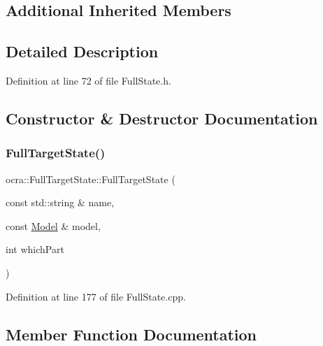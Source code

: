 \subsection*{Additional Inherited Members}


\subsection{Detailed Description}


Definition at line 72 of file Full\+State.\+h.



\subsection{Constructor \& Destructor Documentation}
\hypertarget{classocra_1_1FullTargetState_a8164de6021f986fb82022b2fed1e0402}{}\label{classocra_1_1FullTargetState_a8164de6021f986fb82022b2fed1e0402} 
\subsubsection{\texorpdfstring{Full\+Target\+State()}{FullTargetState()}}
{\footnotesize\ttfamily ocra\+::\+Full\+Target\+State\+::\+Full\+Target\+State (\begin{DoxyParamCaption}\item[{const std\+::string \&}]{name,  }\item[{const \hyperlink{classocra_1_1Model}{Model} \&}]{model,  }\item[{int}]{which\+Part }\end{DoxyParamCaption})}



Definition at line 177 of file Full\+State.\+cpp.



\subsection{Member Function Documentation}
\hypertarget{classocra_1_1FullTargetState_ad7a1b06462ba3cc348e5634e1a0db0b2}{}\label{classocra_1_1FullTargetState_ad7a1b06462ba3cc348e5634e1a0db0b2} 
